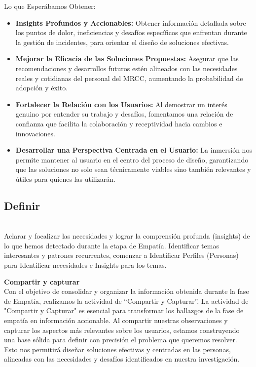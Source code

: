 Lo que Esperábamos Obtener:

\begin{itemize}
    \item \textbf{Insights Profundos y Accionables:} Obtener información detallada sobre los puntos de dolor, ineficiencias y desafíos específicos que enfrentan durante la gestión de incidentes, para 
    orientar el diseño de soluciones efectivas.
    \item \textbf{Mejorar la Eficacia de las Soluciones Propuestas:} Asegurar que las recomendaciones y desarrollos futuros estén alineados con las necesidades reales y cotidianas del personal del MRCC, 
    aumentando la probabilidad de adopción y éxito.
    \item \textbf{Fortalecer la Relación con los Usuarios:} Al demostrar un interés genuino por entender su trabajo y desafíos, fomentamos una relación de confianza que facilita la colaboración y 
    receptividad hacia cambios e innovaciones.
    \item \textbf{Desarrollar una Perspectiva Centrada en el Usuario:} La inmersión nos permite mantener al usuario en el centro del proceso de diseño, garantizando que las soluciones no solo sean 
    técnicamente viables sino también relevantes y útiles para quienes las utilizarán.
\end{itemize}



\subsection{Definir}\\
Aclarar y focalizar las necesidades y lograr la comprensión profunda (insights) de lo que hemos detectado durante la etapa de Empatía.  Identificar temas interesantes y patrones recurrentes, comenzar a 
Identificar Perfiles (Personas) para Identificar necesidades e Insights para los temas.

\textbf{Compartir y capturar}\\
Con el objetivo de consolidar y organizar la información obtenida durante la fase de Empatía, realizamos la actividad de “Compartir y Capturar”.
La actividad de "Compartir y Capturar" es esencial para transformar los hallazgos de la fase de empatía en información accionable. Al compartir nuestras observaciones y capturar los aspectos más relevantes 
sobre los usuarios, estamos construyendo una base sólida para definir con precisión el problema que queremos resolver. Esto nos permitirá diseñar soluciones efectivas y centradas en las personas, alineadas 
con las necesidades y desafíos identificados en nuestra investigación.

